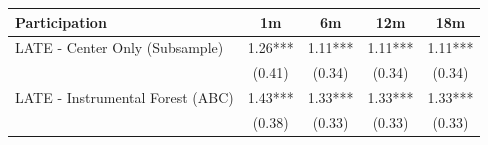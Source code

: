 \begin{tabular}{lcccc}
\toprule 
\midrule 
Participation & 1m & 6m & 12m & 18m \\
\midrule 
LATE - Center Only (Subsample) & 1.26*** & 1.11*** & 1.11*** & 1.11*** \\
 & (0.41) & (0.34) & (0.34) & (0.34) \\
LATE - Instrumental Forest (ABC) & 1.43*** & 1.33*** & 1.33*** & 1.33*** \\
 & (0.38) & (0.33) & (0.33) & (0.33) \\
\midrule 
\bottomrule 
\end{tabular}
